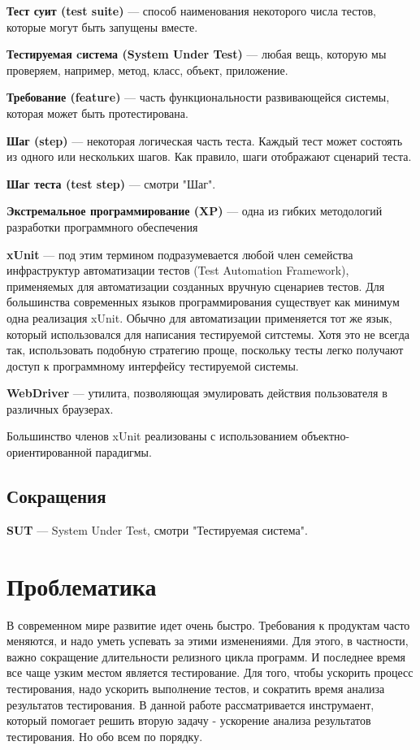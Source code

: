 {\bf Тест суит (test suite)} ---
способ наименования некоторого числа тестов, которые могут быть запущены вместе.

{\bf Тестируемая cистема (System Under Test)} ---
любая вещь, которую мы проверяем, например, метод, класс, объект, приложение.

{\bf Требование (feature)} ---
часть функциональности развивающейся системы, которая может быть протестирована.

{\bf Шаг (step)} ---
некоторая логическая часть теста. Каждый тест может состоять из одного или нескольких шагов. Как правило, шаги отображают сценарий теста.

{\bf Шаг теста (test step)} ---
смотри "Шаг".

{\bf Экстремальное программирование (XP)} ---
одна из гибких методологий разработки программного обеспечения

{\bf xUnit} ---
под этим термином подразумевается любой член семейства инфраструктур автоматизации тестов (Test Automation Framework), применяемых для автоматизации созданных вручную сценариев тестов. Для большинства современных языков программирования существует как минимум одна реализация xUnit. Обычно для автоматизации применяется тот же язык, который использовался для написания тестируемой ситстемы. Хотя это не всегда так, использовать подобную стратегию проще, поскольку тесты легко получают доступ к программному интерфейсу тестируемой системы.

{\bf WebDriver} ---
утилита, позволяющая эмулировать действия пользователя в различных браузерах.

Большинство членов xUnit реализованы с использованием объектно-ориентированной парадигмы.

\subsection{Сокращения}

{\bf SUT} --- System Under Test, смотри "Тестируемая система".

\section{Проблематика}

В современном мире развитие идет очень быстро. Требования к продуктам часто меняются, и надо уметь успевать за этими изменениями. Для этого, в частности, важно сокращение длительности релизного цикла программ. И последнее время все чаще узким местом является тестирование. Для того, чтобы ускорить процесс тестирования, надо ускорить выполнение тестов, и сократить время анализа результатов тестирования. В данной работе рассматривается инструмаент, который помогает решить вторую задачу - ускорение анализа результатов тестирования. Но обо всем по порядку.

